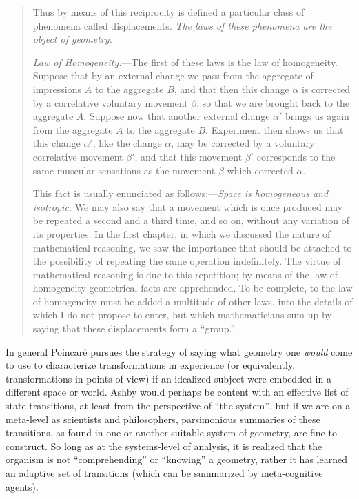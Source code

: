\documentclass{article}
\begin{document}
\begin{quote}
    Thus by means of this reciprocity is defined a particular class of phenomena called displacements.  \emph{The laws of these phenomena are the object of geometry.}
    
    \emph{Law of Homogeneity.}---The first of these laws is the law of homogeneity.  Suppose that by an external change we pass from the aggregate of impressions $A$ to the aggregate $B$, and that then this change $\alpha$ is corrected by a correlative voluntary movement $\beta$, so that we are brought back to the aggregate $A$.  Suppose now that another external change $\alpha'$ brings us again from the aggregate $A$ to the aggregate $B$.  Experiment then shows us that this change $\alpha'$, like the change $\alpha$, may be corrected by a voluntary correlative movement $\beta'$, and that this movement $\beta'$ corresponds to the same muscular sensations as the movement $\beta$ which corrected $\alpha$.
    
    This fact is usually enunciated as follows:---\emph{Space is homogeneous and isotropic.}  We may also say that a movement which is once produced may be repeated a second and a third time, and so on, without any variation of its properties.  In the first chapter, in which we discussed the nature of mathematical reasoning, we saw the importance that should be attached to the possibility of repeating the same operation indefinitely.  The virtue of mathematical reasoning is due to this repetition; by means of the law of homogeneity geometrical facts are apprehended.  To be complete, to the law of homogeneity must be added a multitude of other laws, into the details of which I do not propose to enter, but which mathematicians sum up by saying that these displacements form a ``group.''
    
    \citep[p. 61-64]{Poincare1952}
    
\end{quote}

In general Poincar\'e pursues the strategy of saying what geometry one \emph{would} come to use to characterize transformations in experience (or equivalently, transformations in points of view) if an idealized subject were embedded in a different space or world.  Ashby would perhaps be content with an effective list of state transitions, at least from the perspective of ``the system'', but if we are on a meta-level as scientists and philosophers, parsimonious summaries of these transitions, as found in one or another suitable system of geometry, are fine to construct.  So long as at the systems-level of analysis, it is realized that the organism is not ``comprehending'' or ``knowing'' a geometry, rather it has learned an adaptive set of transitions (which can be summarized by meta-cognitive agents).
\end{document}
